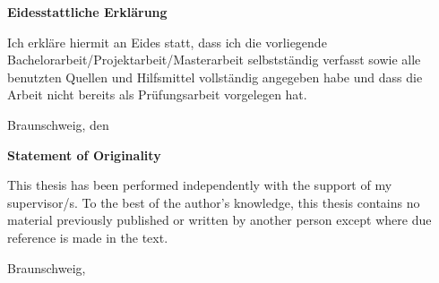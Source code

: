 \maketitle
\cleardoublepage

\thispagestyle{plain} %
\vspace*{7cm}
\ifgerman
	\centerline{\bfseries Eidesstattliche Erklärung}
	\vspace*{1em}
	\noindent
	Ich erkläre hiermit an Eides statt, dass ich die vorliegende
	Bachelorarbeit/Projektarbeit/Masterarbeit selbstständig verfasst sowie alle
	benutzten Quellen und Hilfsmittel vollständig angegeben habe und dass die Arbeit
	nicht bereits als Prüfungsarbeit vorgelegen hat.

	\par
	  \bigskip\noindent Braunschweig, den \thesisdate \par
\else
	\centerline{\bfseries Statement of Originality}
	\vspace*{1em}
	\noindent
	This thesis has been performed independently with the support of my supervisor/s.
	To the best of the author's knowledge, this thesis contains no material previously
	published or written by another person except where due reference is made in the text.

	\par
	  \bigskip\noindent Braunschweig, \thesisdate \par
\fi
  \vspace*{10mm}
  \hfill\hrulefill
\cleardoublepage